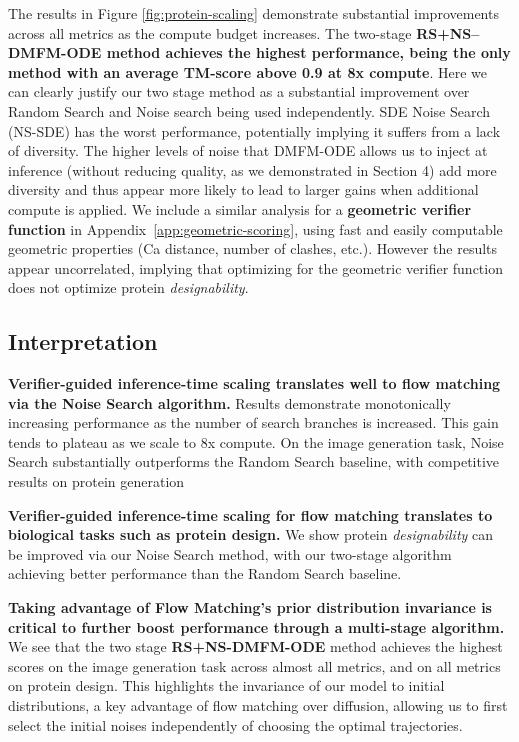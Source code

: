 \documentclass{article} %
\begin{document}
The results in Figure \ref{fig:protein-scaling} demonstrate substantial improvements across all metrics as the compute budget increases. The two-stage \textbf{RS+NS–DMFM-ODE method achieves the highest performance, being the only method with an average TM-score above 0.9 at 8x compute}. Here we can clearly justify our two stage method as a substantial improvement over Random Search and Noise search being used independently. SDE Noise Search (NS-SDE) has the worst performance, potentially implying it suffers from a lack of diversity. The higher levels of noise that DMFM-ODE allows us to inject at inference (without reducing quality, as we demonstrated in Section 4) add more diversity and thus appear more likely to lead to larger gains when additional compute is applied. We include a similar analysis for a \textbf{geometric verifier function} in Appendix~\ref{app:geometric-scoring}, using fast and easily computable geometric properties (Ca distance, number of clashes, etc.). However the results appear uncorrelated, implying that optimizing for the geometric verifier function does not optimize protein \textit{designability}.

\subsection{Interpretation}
\textbf{Verifier-guided inference-time scaling translates well to flow matching via the Noise Search algorithm.} Results demonstrate monotonically increasing performance as the number of search branches is increased. This gain tends to plateau as we scale to 8x compute. On the image generation task, Noise Search substantially outperforms the Random Search baseline, with competitive results on protein generation

\textbf{Verifier-guided inference-time scaling for flow matching translates to biological tasks such as protein design.} We show protein \textit{designability} can be improved via our Noise Search method, with our two-stage algorithm achieving better performance than the Random Search baseline. 

\textbf{Taking advantage of Flow Matching's prior distribution invariance is critical to further boost performance through a multi-stage algorithm.} We see that the two stage \textbf{RS+NS-DMFM-ODE} method achieves the highest scores on the image generation task across almost all metrics, and on all metrics on protein design. This highlights the invariance of our model to initial distributions, a key advantage of flow matching over diffusion, allowing us to first select the initial noises independently of choosing the optimal trajectories.
\end{document}
